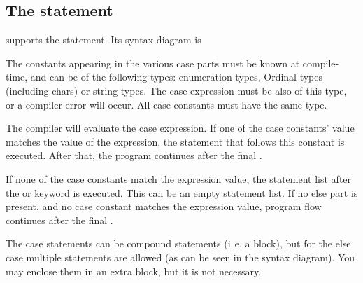 \subsection{The  statement}
\fpc supports the  statement. Its syntax diagram is

The constants appearing in the various case parts must be known at
compile-time, and can be of the following types: enumeration types,
Ordinal types (including chars) or string types.
The case expression must be also of this type, or a compiler error
will occur. All case constants must have the same type.

The compiler will evaluate the case expression. If one of the case
constants' value matches the value of the expression, the statement that follows
this constant is executed. After that, the program continues after the final
.  

If none of the case constants match the expression value, the statement
list after the   or 
keyword is executed. This can be an empty statement list.
If no else part is present, and no case constant matches the expression
value, program flow continues after the final .

The case statements can be compound statements (i.\,e. a 
block), but for the else case multiple statements are allowed (as can be
seen in the syntax diagram). You may enclose them in an extra  
block, but it is not necessary.

